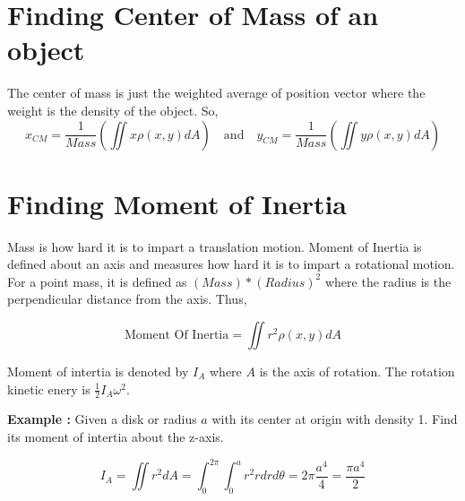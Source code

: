 \section{Finding Center of Mass of an object}

The center of mass is just the weighted average of position vector where the weight is the density of the object.
So,
$$ x_{CM} = \frac{1}{Mass} \left( \iint x \rho(x, y) dA \right) \quad \text{and} \quad y_{CM} = \frac{1}{Mass} \left( \iint y \rho(x, y) dA \right) $$

\section{Finding Moment of Inertia}

Mass is how hard it is to impart a translation motion.
Moment of Inertia is defined about an axis and measures how hard it is to impart a rotational motion.
For a point mass, it is defined as $(Mass) * (Radius) ^ 2$ where the radius is the perpendicular distance from the axis.
Thus,

$$ \text{Moment Of Inertia} = \iint r^2 \rho(x, y) dA $$ 

Moment of intertia is denoted by $I_A$ where $A$ is the axis of rotation. 
The rotation kinetic enery is $\frac{1}{2} I_A \omega^2 $.

{\bf Example :} Given a disk or radius $a$ with its center at origin with density 1. Find its moment of intertia about the z-axis.

$$ 
I_A = \iint r^2 dA = \int_0^{2\pi} \int_0^{a} r^2 r dr d\theta 
    = 2\pi \frac{a^4}{4} = \frac{\pi a^4}{2}
$$